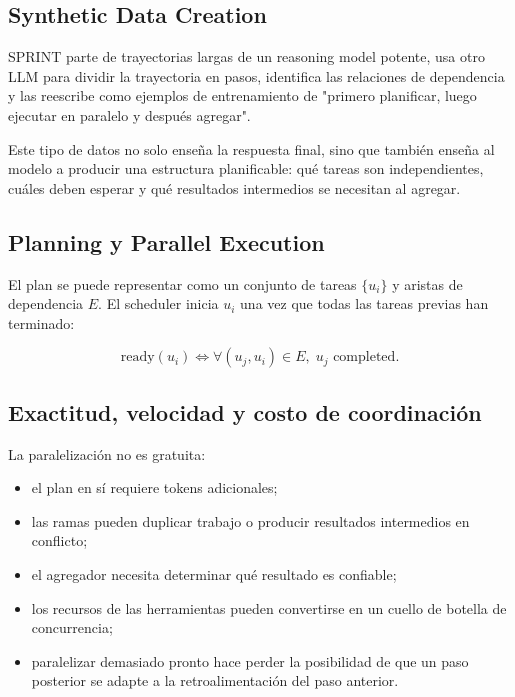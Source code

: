 \documentclass[a4paper]{article}
\begin{document}
\subsection{Synthetic Data Creation}

SPRINT parte de trayectorias largas de un reasoning model potente, usa otro LLM para dividir la trayectoria en pasos, identifica las relaciones de dependencia y las reescribe como ejemplos de entrenamiento de "primero planificar, luego ejecutar en paralelo y después agregar".


Este tipo de datos no solo enseña la respuesta final, sino que también enseña al modelo a producir una estructura planificable: qué tareas son independientes, cuáles deben esperar y qué resultados intermedios se necesitan al agregar.

\subsection{Planning y Parallel Execution}


El plan se puede representar como un conjunto de tareas $\{u_i\}$ y aristas de dependencia $E$. El scheduler inicia $u_i$ una vez que todas las tareas previas han terminado:

$$
\mathrm{ready}(u_i)\iff \forall (u_j,u_i)\in E,\;u_j\text{ completed}.
$$


\subsection{Exactitud, velocidad y costo de coordinación}

La paralelización no es gratuita:

\begin{itemize}
    \item el plan en sí requiere tokens adicionales;
    \item las ramas pueden duplicar trabajo o producir resultados intermedios en conflicto;
    \item el agregador necesita determinar qué resultado es confiable;
    \item los recursos de las herramientas pueden convertirse en un cuello de botella de concurrencia;
    \item paralelizar demasiado pronto hace perder la posibilidad de que un paso posterior se adapte a la retroalimentación del paso anterior.
\end{itemize}
\end{document}
